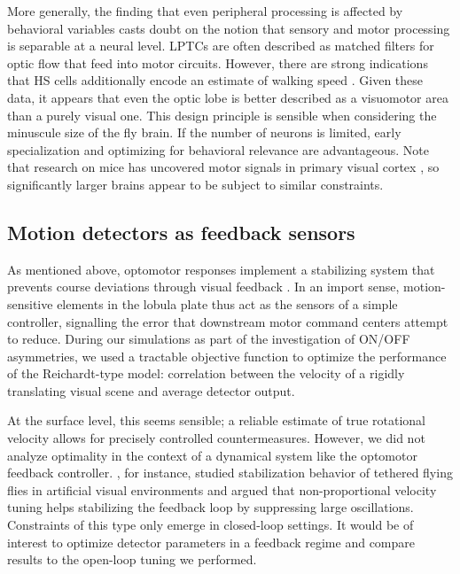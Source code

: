 More generally, the finding that even peripheral processing is affected by behavioral variables casts doubt on the notion that sensory and motor processing is separable at a neural level. LPTCs are often described as matched filters for optic flow that feed into motor circuits. However, there are strong indications that HS cells additionally encode an estimate of walking speed \citep{Fujiwara:2017aa}. Given these data, it appears that even the optic lobe is better described as a visuomotor area than a purely visual one. This design principle is sensible when considering the minuscule size of the fly brain. If the number of neurons is limited, early specialization and optimizing for behavioral relevance are advantageous. Note that research on mice has uncovered motor signals in primary visual cortex \citep{Keller:2012aa,Saleem:2013aa}, so significantly larger brains appear to be subject to similar constraints.


\subsection{Motion detectors as feedback sensors}
As mentioned above, optomotor responses implement a stabilizing system that prevents course deviations through visual feedback \citep{Goetz:1965aa}. In an import sense, motion-sensitive elements in the lobula plate thus act as the sensors of a simple controller, signalling the error that downstream motor command centers attempt to reduce. During our simulations as part of the investigation of ON/OFF asymmetries, we used a tractable objective function to optimize the performance of the Reichardt-type model: correlation between the velocity of a rigidly translating visual scene and average detector output. 

At the surface level, this seems sensible; a reliable estimate of true rotational velocity allows for precisely controlled countermeasures. However, we did not analyze optimality in the context of a dynamical system like the optomotor feedback controller. \citet{Warzecha:1996bm}, for instance, studied stabilization behavior of tethered flying flies in artificial visual environments and argued that non-proportional velocity tuning helps stabilizing the feedback loop by suppressing large oscillations. Constraints of this type only emerge in closed-loop settings. It would be of interest to optimize detector parameters in a feedback regime and compare results to the open-loop tuning we performed.

